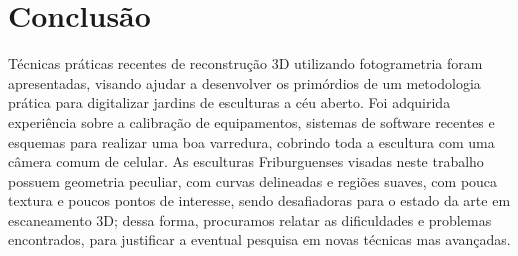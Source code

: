 \chapter{Conclusão}
Técnicas práticas recentes de reconstrução 3D utilizando fotogrametria foram
apresentadas, visando
ajudar a desenvolver os primórdios de um metodologia prática para digitalizar jardins de esculturas a céu
aberto. Foi adquirida experiência sobre a calibração de equipamentos, sistemas
de software recentes e esquemas para realizar uma boa varredura, cobrindo toda a
escultura com uma câmera comum de celular.  As esculturas Friburguenses visadas neste trabalho
possuem geometria peculiar, com curvas delineadas e regiões suaves, com pouca
textura e poucos pontos de interesse, sendo desafiadoras para o estado da arte
em escaneamento 3D; dessa forma, procuramos relatar as dificuldades e problemas
encontrados, para justificar a eventual pesquisa em novas técnicas mas
avançadas.

